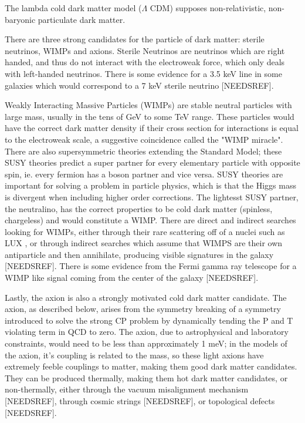 \documentclass[12pt, twosides]{book}
\begin{document}
The lambda cold dark matter model ($\Lambda$ CDM) supposes non-relativistic, non-baryonic particulate dark matter. 

There are three strong candidates for the particle of dark matter: sterile neutrinos, WIMPs and axions. Sterile Neutrinos are neutrinos which are right handed, and thus do not interact with the electroweak force, which only deals with left-handed neutrinos. There is some evidence for a 3.5 keV line in some galaxies which would correspond to a 7 keV sterile neutrino [NEEDSREF].

Weakly Interacting Massive Particles (WIMPs) are stable neutral particles with large mass, usually in the tens of GeV to some TeV range. These particles would have the correct dark matter density if their cross section for interactions is equal to the electroweak scale, a suggestive coincidence called the "WIMP miracle". There are also supersymmetric theories extending the Standard Model; these SUSY theories predict a super partner for every elementary particle with opposite spin, ie. every fermion has a boson partner and vice versa. SUSY theories are important for solving a problem in particle physics, which is that the Higgs mass is divergent when including higher order corrections. The lightesst SUSY partner, the neutralino, has the correct properties to be cold dark matter (spinless, chargeless) and would constitute a WIMP. There are direct and indirect searches looking for WIMPs, either through their rare scattering off of a nuclei such as LUX \cite{lux14}, or through indirect searches which assume that WIMPS are their own antiparticle and then annihilate, producing visible signatures in the galaxy [NEEDSREF]. There is some evidence from the Fermi gamma ray telescope for a WIMP like signal coming from the center of the galaxy [NEEDSREF].

Lastly, the axion is also a strongly motivated cold dark matter candidate. The axion, as described below, arises from the symmetry breaking of a symmetry introduced to solve the strong CP problem by dynamically tending the P and T violating term in QCD to zero. The axion, due to astrophysical and laboratory constraints, would need to be less than approximately 1 meV; in the models of the axion, it's coupling is related to the mass, so these light axions have extremely feeble couplings to matter, making them good dark matter candidates. They can be produced thermally, making them hot dark matter candidates, or non-thermally, either through the vacuum misalignment mechanism [NEEDSREF], through cosmic strings [NEEDSREF], or topological defects [NEEDSREF].
\end{document}
